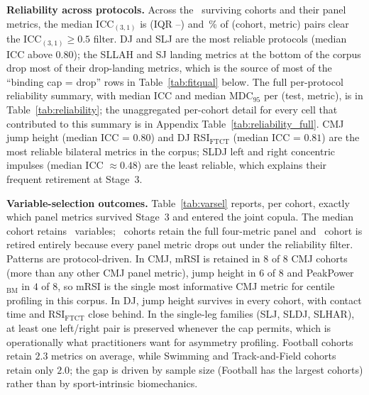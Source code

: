 \documentclass[10pt]{article}
\begin{document}
\textbf{Reliability across protocols.}
Across the \Ncohorts{}~surviving cohorts and their panel metrics, the
median ICC$_{(3,1)}$ is \IccMed{} (IQR \IccQone{}--\IccQthree{}) and
\IccPass{}\,\% of (cohort, metric) pairs clear the
ICC$_{(3,1)}\!\geq\!0.5$ filter. DJ and SLJ are the most reliable
protocols (median ICC above $0.80$); the SLLAH and SJ landing
metrics at the bottom of the corpus drop most of their drop-landing
metrics, which is the source of most of the ``binding cap = drop''
rows in Table~\ref{tab:fitqual} below. The full per-protocol
reliability summary, with median ICC and median MDC$_{95}$ per
(test, metric), is in Table~\ref{tab:reliability}; the unaggregated
per-cohort detail for every cell that contributed to this summary is
in Appendix Table~\ref{tab:reliability_full}. CMJ jump height
(median ICC = $0.80$) and DJ RSI$_{\text{FTCT}}$ (median ICC = $0.81$)
are the most reliable bilateral metrics in the corpus; SLDJ left and
right concentric impulses (median ICC $\approx 0.48$) are the least
reliable, which explains their frequent retirement at Stage~3.

\begin{table}[!htbp]
\centering
\scriptsize
\caption{Per-protocol reliability: median ICC$_{(3,1)}$ and median
MDC$_{95}$ across cohorts with test--retest pairs; $k$ is the number of
contributing cohorts.}
\label{tab:reliability}

\end{table}

\textbf{Variable-selection outcomes.}
Table~\ref{tab:varsel} reports, per cohort, exactly which panel
metrics survived Stage~3 and entered the joint copula. The median
cohort retains \NselMed{}~variables; \NkeptFull{}~cohorts retain the
full four-metric panel and \Nretired{}~cohort is retired entirely
because every panel metric drops out under the reliability filter.
Patterns are protocol-driven. In CMJ, mRSI is retained in $8$ of
$8$ CMJ cohorts (more than any other CMJ panel metric), jump height
in $6$ of $8$ and PeakPower$_{\text{BM}}$ in $4$ of $8$, so mRSI is
the single most informative CMJ metric for centile profiling in this
corpus. In DJ, jump height survives in every cohort, with contact
time and RSI$_{\text{FTCT}}$ close behind. In the single-leg families
(SLJ, SLDJ, SLHAR), at least one left/right pair is preserved
whenever the cap permits, which is operationally what practitioners
want for asymmetry profiling. Football cohorts retain $2.3$
metrics on average, while Swimming and Track-and-Field cohorts
retain only $2.0$; the gap is driven by sample size (Football has the
largest cohorts) rather than by sport-intrinsic biomechanics.
\end{document}
